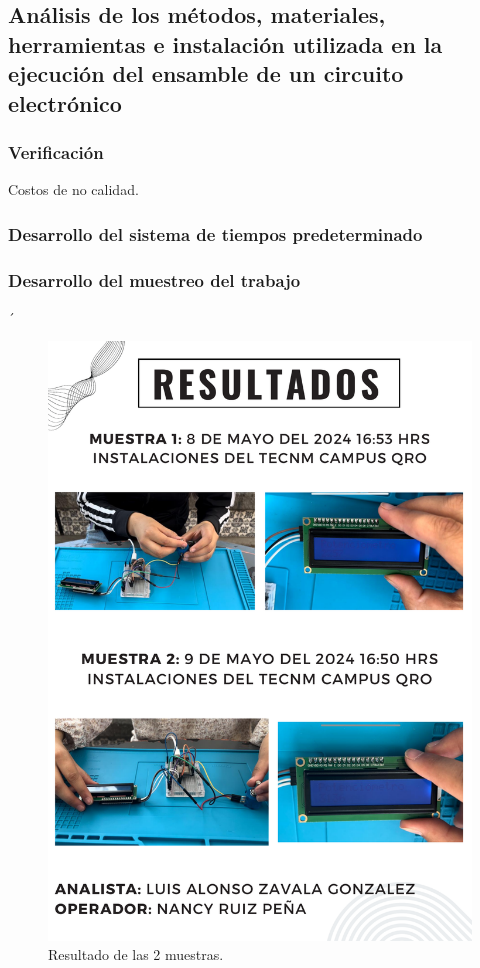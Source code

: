     \subsection{Análisis de los métodos, materiales, herramientas e instalación utilizada en la ejecución del ensamble de un circuito electrónico}
    
    \subsubsection{Verificación}
    
    Costos de no calidad.
    \subsubsection{Desarrollo del sistema de tiempos predeterminado}
    \subsubsection{Desarrollo del muestreo del trabajo}
    ´
    \begin{figure}[H]
        \centering
        \includegraphics[scale=0.4]{35/Img/reultadosEnsamble.pdf}
        \caption{Resultado de las 2 muestras.}
    \end{figure}
